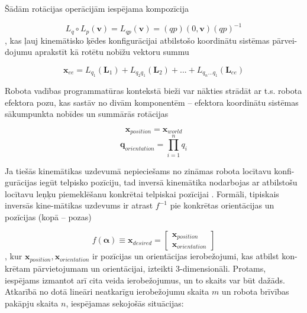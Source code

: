 \documentclass[12pt, a4paper]{article}
\numberwithin{equation}{section} %
\begin{document}
Šādām rotācijas operācijām iespējama kompozīcija

\begin{equation}
    L_q \circ L_p (\boldsymbol{v}) = L_{qp}(\boldsymbol{v}) = (qp)(0,\boldsymbol{v})(qp)^{-1}
\end{equation}
, kas ļauj kinemātisko ķēdes konfigurācijai atbilstošo koordinātu sistēmas pārvei-dojumu aprakstīt kā rotētu nobīžu vektoru summu

\begin{equation}
    \boldsymbol{x}_{ee} = L_{q_1}(\boldsymbol{L}_1) + L_{q_2q_1}(\boldsymbol{L}_2) + ... + L_{q_n...q_1}(\boldsymbol{L}_{ee})
\end{equation}

Robota vadības programmatūras kontekstā bieži var nākties strādāt ar t.s. robota efektora pozu, kas sastāv no divām komponentēm -- efektora koordinātu sistēmas sākumpunkta nobīdes un summārās rotācijas

\begin{equation}
    \boldsymbol{x}_{position} = \boldsymbol{x}_{world}
\end{equation}
\begin{equation}
    \boldsymbol{q}_{orientation} = \prod_{i=1}^n q_i
\end{equation}

Ja tiešās kinemātikas uzdevumā nepieciešams no zināmas robota locītavu konfi-gurācijas iegūt telpisko pozīciju, tad inversā kinemātika nodarbojas ar atbilstošu locītavu leņķu piemeklēšanu konkrētai telpiskai pozīcijai \cite{inverse_kinematics_illinois}. Formāli, tipiskais inversās kine-mātikas uzdevums ir atrast $f^{-1}$ pie konkrētas orientācijas un pozīcijas (kopā -- pozas)

\begin{equation}
    f(\boldsymbol{\alpha}) \equiv \boldsymbol{x}_{desired} = 
    \begin{bmatrix}
        \boldsymbol{x}_{position} \\
        \boldsymbol{x}_{orientation} 
    \end{bmatrix}
\end{equation}
, kur $\boldsymbol{x}_{position}, \boldsymbol{x}_{orientation}$ ir pozīcijas un orientācijas ierobežojumi, kas atbilst kon-krētam pārvietojumam un orientācijai, izteikti 3-dimensionāli. Protams, iespējams izmantot arī cita veida ierobežojumus, un to skaits var būt dažāds. Atkarībā no dotā lineāri neatkarīgu ierobežojumu skaita $m$ un robota brīvības pakāpju skaita $n$, iespējamas sekojošās situācijas:
\end{document}

